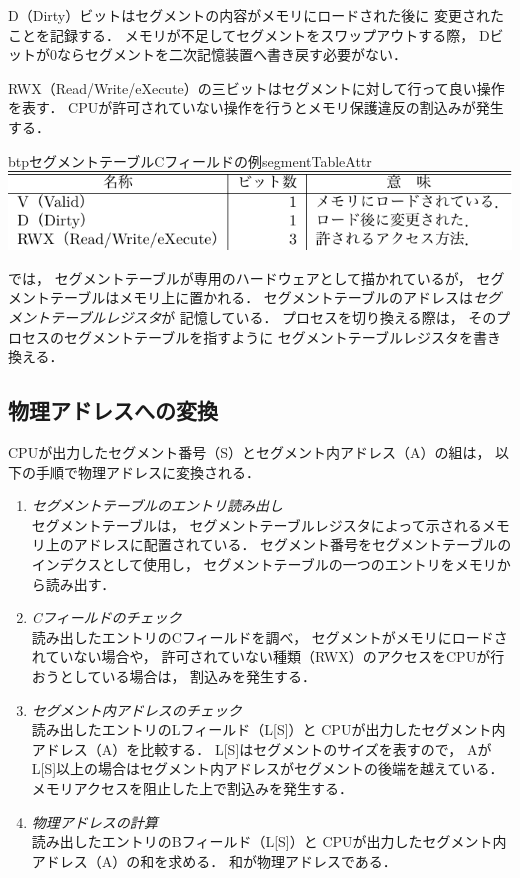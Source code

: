 D（Dirty）ビットはセグメントの内容がメモリにロードされた後に
変更されたことを記録する．
メモリが不足してセグメントをスワップアウトする際，
Dビットが0ならセグメントを二次記憶装置へ書き戻す必要がない．

RWX（Read/Write/eXecute）の三ビットはセグメントに対して行って良い操作を表す．
CPUが許可されていない操作を行うとメモリ保護違反の割込みが発生する．

\begin{mytable}{btp}{セグメントテーブルCフィールドの例}{segmentTableAttr}
  \includegraphics[scale=1.0]{Tbl/segmentTableAttr.pdf}
\end{mytable}

では，
セグメントテーブルが専用のハードウェアとして描かれているが，
セグメントテーブルはメモリ上に置かれる．
セグメントテーブルのアドレスは\emph{セグメントテーブルレジスタ}が
記憶している．
プロセスを切り換える際は，
そのプロセスのセグメントテーブルを指すように
セグメントテーブルレジスタを書き換える．

\subsection{物理アドレスへの変換}
CPUが出力したセグメント番号（S）とセグメント内アドレス（A）の組は，
以下の手順で物理アドレスに変換される．

\begin{enumerate}
\item \emph{セグメントテーブルのエントリ読み出し}\\
セグメントテーブルは，
セグメントテーブルレジスタによって示されるメモリ上のアドレスに配置されている．
セグメント番号をセグメントテーブルのインデクスとして使用し，
セグメントテーブルの一つのエントリをメモリから読み出す．

\item \emph{Cフィールドのチェック}\\
読み出したエントリのCフィールドを調べ，
セグメントがメモリにロードされていない場合や，
許可されていない種類（RWX）のアクセスをCPUが行おうとしている場合は，
割込みを発生する．

\item \emph{セグメント内アドレスのチェック}\\
読み出したエントリのLフィールド（L[S]）と
CPUが出力したセグメント内アドレス（A）を比較する．
L[S]はセグメントのサイズを表すので，
AがL[S]以上の場合はセグメント内アドレスがセグメントの後端を越えている．
メモリアクセスを阻止した上で割込みを発生する．

\item \emph{物理アドレスの計算}\\
読み出したエントリのBフィールド（L[S]）と
CPUが出力したセグメント内アドレス（A）の和を求める．
和が物理アドレスである．
\end{enumerate}

